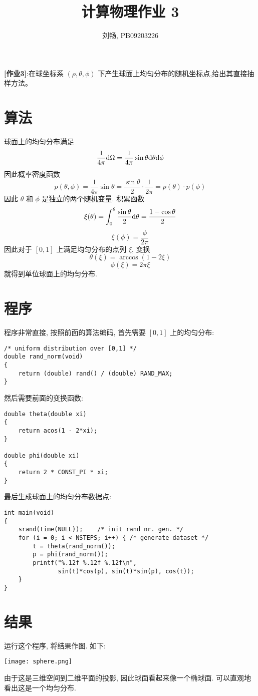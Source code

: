 \documentclass{ctexart}
\def\dd{{\rm d}}
\begin{document}
\title{计算物理作业 3}
\author{刘畅, PB09203226}
\maketitle

{\bf[作业3]}:\quad 在球坐标系 $(\rho,\theta,\phi)$
下产生球面上均匀分布的随机坐标点,给出其直接抽样方法。

\section{算法}
球面上的均匀分布满足
\[
\frac{1}{4\pi}\dd \Omega = \frac{1}{4\pi}\sin\theta\dd\theta\dd\phi
\]
因此概率密度函数
\[
p(\theta,\phi) = \frac{1}{4\pi}\sin\theta = \frac{\sin\theta}{2}\cdot
\frac{1}{2\pi} = p(\theta)\cdot p(\phi)
\]
因此 $\theta$ 和 $\phi$ 是独立的两个随机变量. 积累函数
\[
\xi(\theta) = \int^\theta_0 \frac{\sin\theta}{2}\dd\theta
= \frac{1-\cos\theta}{2}
\]
\[
\xi(\phi) = \frac{\phi}{2\pi}
\]
因此对于 $[0,1]$ 上满足均匀分布的点列 $\xi$, 变换
\[
\theta(\xi) = \arccos(1-2\xi)
\]
\[
\phi(\xi) = 2\pi\xi
\]
就得到单位球面上的均匀分布.

\section{程序}
程序非常直接, 按照前面的算法编码, 首先需要 $[0,1]$ 上的均匀分布:
\begin{verbatim}
/* uniform distribution over [0,1] */
double rand_norm(void)
{
    return (double) rand() / (double) RAND_MAX;
}
\end{verbatim}
然后需要前面的变换函数:
\begin{verbatim}
double theta(double xi)
{
    return acos(1 - 2*xi);
}

double phi(double xi)
{
    return 2 * CONST_PI * xi;
}
\end{verbatim}
最后生成球面上的均匀分布数据点:
\begin{verbatim}
int main(void)
{
    srand(time(NULL));    /* init rand nr. gen. */
    for (i = 0; i < NSTEPS; i++) { /* generate dataset */
        t = theta(rand_norm());
        p = phi(rand_norm());
        printf("%.12f %.12f %.12f\n",
               sin(t)*cos(p), sin(t)*sin(p), cos(t));
    }
}
\end{verbatim}

\section{结果}
运行这个程序, 将结果作图. 如下:
\begin{center}
\texttt{[image: sphere.png]}
\end{center}
由于这是三维空间到二维平面的投影, 因此球面看起来像一个椭球面.
可以直观地看出这是一个均匀分布.
\end{document}
